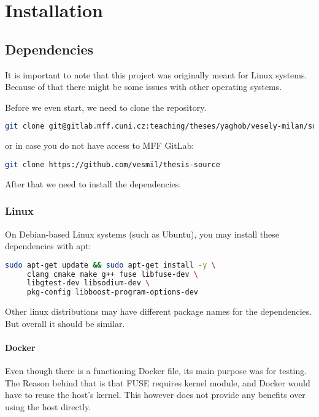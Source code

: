 \chapter{Installation}

\section{Dependencies}\label{sec:dependencies}

It is important to note that this project was originally meant for Linux systems.
Because of that there might be some issues with other operating systems.

Before we even start, we need to clone the repository.

\begin{lstlisting}[language=bash, basicstyle=\ttfamily\small]
git clone git@gitlab.mff.cuni.cz:teaching/theses/yaghob/vesely-milan/source-code.git
\end{lstlisting}

or in case you do not have access to MFF GitLab:

\begin{lstlisting}[language=bash, basicstyle=\ttfamily\small]
git clone https://github.com/vesmil/thesis-source
\end{lstlisting}

After that we need to install the dependencies.

\subsection*{Linux}

On Debian-based Linux systems (such as Ubuntu), you may install these dependencies with apt:

\begin{lstlisting}[language=bash, basicstyle=\ttfamily\small]
sudo apt-get update && sudo apt-get install -y \
     clang cmake make g++ fuse libfuse-dev \
     libgtest-dev libsodium-dev \
     pkg-config libboost-program-options-dev
\end{lstlisting}

Other linux distributions may have different package names for the dependencies.
But overall it should be similar.

\subsubsection*{Docker}

Even though there is a functioning Docker file, its main purpose was for testing.
The Reason behind that is that FUSE requires kernel module, and Docker would have to reuse the host's kernel.
This however does not provide any benefits over using the host directly.

